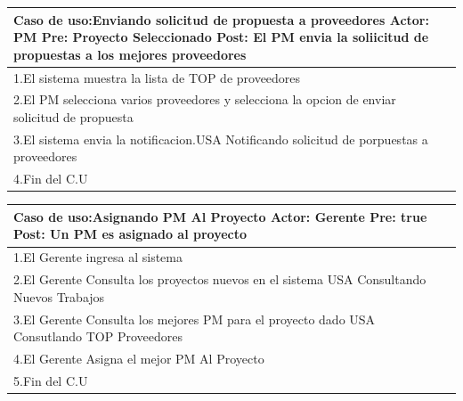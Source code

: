 \begin{longtable}{|p{}|p{}|}
    \hline
    \multicolumn{2}{|p{16cm}|}{
        \textbf{Caso de uso:}Enviando solicitud de propuesta a proveedores\newline
        \textbf{Actor:} PM\newline
        \textbf{Pre: }Proyecto Seleccionado\newline
        \textbf{Post:} El PM envia la soliicitud de propuestas a los mejores proveedores
    }\\
    \hline
    1.El sistema muestra la lista de TOP de proveedores & \\
    \hline
    2.El PM selecciona varios proveedores y selecciona la opcion de enviar solicitud de propuesta& \\
    \hline
    3.El sistema envia la notificacion.USA Notificando solicitud de porpuestas a proveedores& \\
    \hline
    4.Fin del C.U&\\
    \hline
\end{longtable}

\begin{longtable}{|p{}|p{}|}
    \hline
    \multicolumn{2}{|p{16cm}|}{
        \textbf{Caso de uso:}Asignando PM Al Proyecto\newline
        \textbf{Actor:} Gerente\newline
        \textbf{Pre: }true\newline
        \textbf{Post:} Un PM es asignado al proyecto
    }\\
    \hline
    1.El Gerente ingresa al sistema & \\
    \hline
    2.El Gerente Consulta los proyectos nuevos en el sistema USA Consultando Nuevos Trabajos&    \\
    \hline
    3.El Gerente Consulta los mejores PM para el proyecto dado USA Consutlando TOP Proveedores& \\
    \hline
    4.El Gerente Asigna el mejor PM Al Proyecto&\\
    \hline
    5.Fin del C.U&\\
    \hline
\end{longtable}


